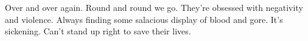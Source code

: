 

Over and over again.  Round and round we go.  They're obsessed with
negativity and violence.  Always finding some salacious display of
blood and gore.  It's sickening.  Can't stand up right to save their
lives.

\bye
